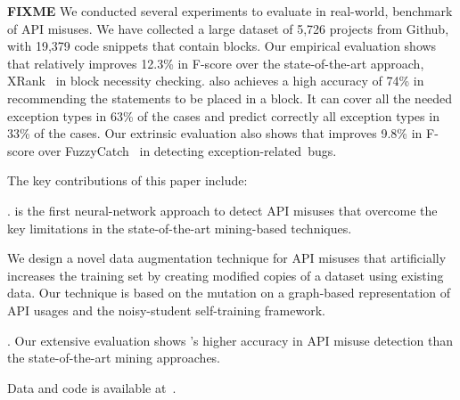 {\bf FIXME} We conducted several experiments to evaluate {\tool} in
real-world, benchmark of API misuses. We have collected a large
dataset of 5,726 projects from Github, with 19,379 code snippets that
contain  blocks.
%
Our empirical evaluation shows that {\tool} relatively
improves 12.3\% in F-score over the state-of-the-art approach,
XRank~\cite{xrank-fse20} in  block necessity checking.
{\tool} also achieves a high accuracy of 74\% in recommending the
statements to be placed in a  block. It can cover all
the needed exception types in 63\% of the cases and predict correctly
all exception types in 33\% of the cases. Our extrinsic evaluation
also shows that {\tool} improves 9.8\% in F-score over
FuzzyCatch~\cite{xrank-fse20} in detecting exception-related~bugs.

The key contributions of this paper include:

\vspace{2pt}
. {\tool} is the first neural-network approach to
detect API misuses that overcome the key limitations in the
state-of-the-art mining-based techniques.

\vspace{2pt}
 We
design a novel data augmentation technique for API misuses that
artificially increases the training set by creating modified copies of
a dataset using existing data. Our technique is based on the mutation
on a graph-based representation of API usages and the noisy-student
self-training framework.

. Our extensive evaluation
shows {\tool}'s higher accuracy in API misuse detection than the
state-of-the-art mining approaches.

Data and code is available at~\cite{muinspect-website}.
